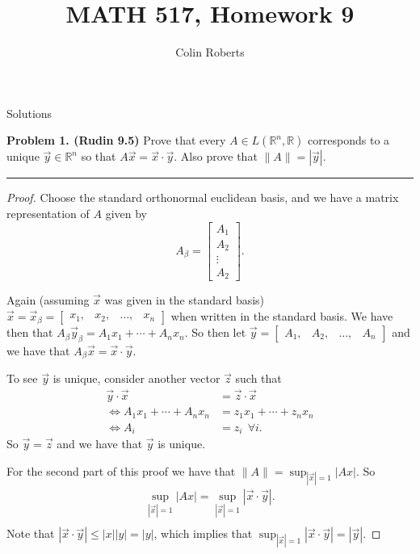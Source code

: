 \documentclass[leqno]{article}
\author{Colin Roberts}
\title{MATH 517, Homework 9}
\theoremstyle{nonumberplain}
\newtheorem{proof}{Proof}
\newcommand{\R}{\mathbb{R}}
\begin{document}
\maketitle
\begin{large}
\begin{center}
Solutions
\end{center}
\end{large}
\pagebreak


\noindent\textbf{Problem 1. (Rudin 9.5)} Prove that every $A\in L(\R^n,\R)$ corresponds to a unique $\vec{y} \in \R^n$ so that $A\vec{x} = \vec{x} \cdot \vec{y}$. Also prove that $\|A\|=|\vec{y}|$.

\noindent\rule[0.5ex]{\linewidth}{1pt}

\begin{proof}
Choose the standard orthonormal euclidean basis, and we have a matrix representation of $A$ given by 
\[
A_\beta=
\begin{bmatrix}
A_1\\
A_2\\
\vdots\\
A_2
\end{bmatrix}.
\]

Again (assuming $\vec{x}$ was given in the standard basis) $\vec{x}=\vec{x}_\beta = \begin{bmatrix} x_1,& x_2,& \dots,& x_n \end{bmatrix}$ when written in the standard basis.  We have then that $A_\beta \vec{y}_\beta = A_1x_1+\cdots +A_nx_n$.  So then let $\vec{y}=\begin{bmatrix} A_1, & A_2,& \dots,& A_n \end{bmatrix}$ and we have that $A_\beta \vec{x} = \vec{x}\cdot \vec{y}$. 

To see $\vec{y}$ is unique, consider another vector $\vec{z}$ such that
\begin{align*}
\vec{y}\cdot \vec{x} &= \vec{z}\cdot \vec{x}\\
\iff A_1x_1+\cdots + A_nx_n &= z_1x_1 + \cdots + z_nx_n\\
\iff A_i&=z_i ~~ \forall i.
\end{align*}
So $\vec{y}=\vec{z}$ and we have that $\vec{y}$ is unique.

For the second part of this proof we have that $\|A\|=\sup_{|\vec{x}|=1} |Ax|$.  So
\begin{align*}
\sup_{|\vec{x}|=1} |Ax|= \sup_{|\vec{x}|=1}|\vec{x}\cdot \vec{y}|.\\
\end{align*}
Note that $|\vec{x}\cdot \vec{y}|\leq |x||y|=|y|$, which implies that $\sup_{|\vec{x}|=1}|\vec{x}\cdot \vec{y}|=|\vec{y}|$.
\end{proof}
\end{document}
